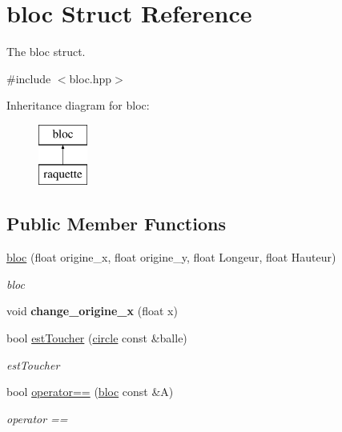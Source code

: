\hypertarget{structbloc}{\section{bloc Struct Reference}
\label{structbloc}
}


The bloc struct.  




{\ttfamily \#include $<$bloc.\-hpp$>$}

Inheritance diagram for bloc\-:\begin{figure}[H]
\begin{center}
\leavevmode
\includegraphics[height=2.000000cm]{structbloc}
\end{center}
\end{figure}
\subsection*{Public Member Functions}
\begin{DoxyCompactItemize}
\item 
\hyperlink{structbloc_a022f138ba1573e51ea489e9d2d9343af}{bloc} (float origine\-\_\-x, float origine\-\_\-y, float Longeur, float Hauteur)
\begin{DoxyCompactList}\small\item\em bloc \end{DoxyCompactList}\item 
\hypertarget{structbloc_a87bd99e1301d4b3fd8913cc6acf29969}{void {\bfseries change\-\_\-origine\-\_\-x} (float x)}\label{structbloc_a87bd99e1301d4b3fd8913cc6acf29969}

\item 
bool \hyperlink{structbloc_a51aa6ddde5ddfec73ab1ac6004a1e09c}{est\-Toucher} (\hyperlink{structcircle}{circle} const \&balle)
\begin{DoxyCompactList}\small\item\em est\-Toucher \end{DoxyCompactList}\item 
bool \hyperlink{structbloc_a731b8b1d5fe6c1cf9e0edcc5c5cccc1b}{operator==} (\hyperlink{structbloc}{bloc} const \&A)
\begin{DoxyCompactList}\small\item\em operator == \end{DoxyCompactList}\end{DoxyCompactItemize}
